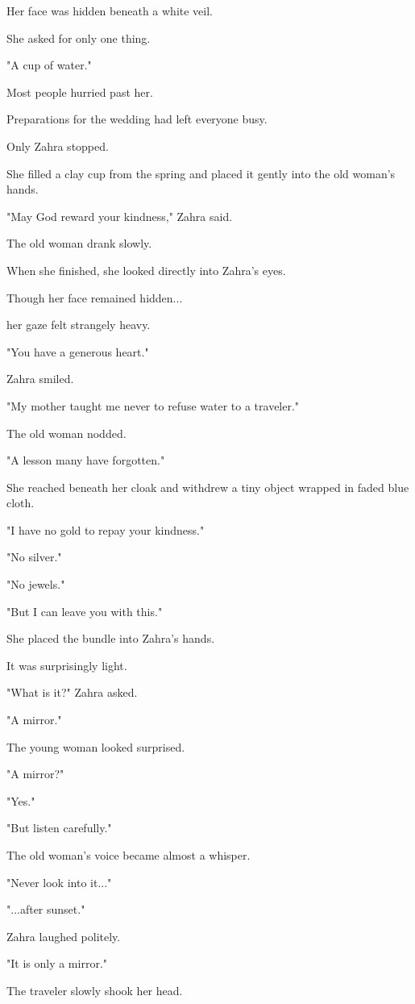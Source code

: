 \documentclass[12pt,openany]{book}
\begin{document}
Her face was hidden beneath a white veil.

She asked for only one thing.

"A cup of water."

Most people hurried past her.

Preparations for the wedding had left everyone busy.

Only Zahra stopped.

She filled a clay cup from the spring and placed it gently into the old woman's hands.

"May God reward your kindness," Zahra said.

The old woman drank slowly.

When she finished, she looked directly into Zahra's eyes.

Though her face remained hidden...

her gaze felt strangely heavy.

"You have a generous heart."

Zahra smiled.

"My mother taught me never to refuse water to a traveler."

The old woman nodded.

"A lesson many have forgotten."

She reached beneath her cloak and withdrew a tiny object wrapped in faded blue cloth.

"I have no gold to repay your kindness."

"No silver."

"No jewels."

"But I can leave you with this."

She placed the bundle into Zahra's hands.

It was surprisingly light.

"What is it?" Zahra asked.

"A mirror."

The young woman looked surprised.

"A mirror?"

"Yes."

"But listen carefully."

The old woman's voice became almost a whisper.

"Never look into it..."

"...after sunset."

Zahra laughed politely.

"It is only a mirror."

The traveler slowly shook her head.
\end{document}
